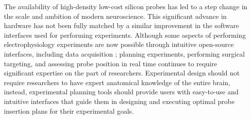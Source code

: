 
The availability of high-density low-cost silicon probes \citep{jun2017fully} has led to a step change in the scale \citep{steinmetz2019distributed} and ambition \citep{koch2022next} of modern neuroscience. This significant advance in hardware has not been fully matched by a similar improvement in the software interfaces used for performing experiments. Although some aspects of performing electrophysiology experiments are now possible through intuitive open-source interfaces, including data acquisition \citep{siegle2017open}; planning experiments, performing surgical targeting, and assessing probe position in real time continues to require significant expertise on the part of researchers. Experimental design should not require researchers to have expert anatomical knowledge of the entire brain, instead, experimental planning tools should provide users with easy-to-use and intuitive interfaces that guide them in designing and executing optimal probe insertion plans for their experimental goals. 